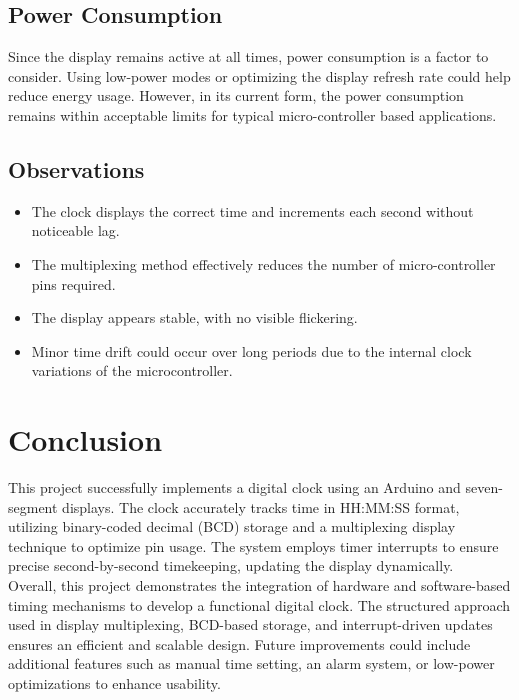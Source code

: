 \documentclass{article}
\theoremstyle{remark}
\begin{document}
\subsection{Power Consumption}
Since the display remains active at all times, power consumption is a factor to consider. Using low-power modes or optimizing the display refresh rate could help reduce energy usage. However, in its current form, the power consumption remains within acceptable limits for typical micro-controller based applications.


\subsection{Observations}
\begin{itemize}
    \item The clock displays the correct time and increments each second without noticeable lag.
    \item The multiplexing method effectively reduces the number of micro-controller pins required.
    \item The display appears stable, with no visible flickering.
    \item Minor time drift could occur over long periods due to the internal clock variations of the microcontroller.
\end{itemize}

\newpage

\section{Conclusion}

This project successfully implements a digital clock using an Arduino and seven-segment displays. The clock accurately tracks time in HH:MM:SS format, utilizing binary-coded decimal (BCD) storage and a multiplexing display technique to optimize pin usage. The system employs timer interrupts to ensure precise second-by-second timekeeping, updating the display dynamically.\\

Overall, this project demonstrates the integration of hardware and software-based timing mechanisms to develop a functional digital clock. The structured approach used in display multiplexing, BCD-based storage, and interrupt-driven updates ensures an efficient and scalable design. Future improvements could include additional features such as manual time setting, an alarm system, or low-power optimizations to enhance usability.
\end{document}
